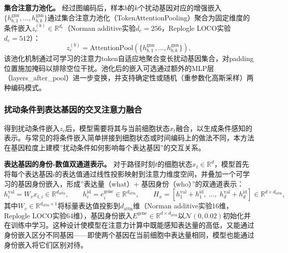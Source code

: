\textbf{集合注意力池化。} 经过图编码后，样本$b$的$k$个扰动基因对应的增强嵌入$\{h_{b,1}^{\mathrm{gnn}},\ldots,h_{b,k}^{\mathrm{gnn}}\}$通过集合注意力池化（TokenAttentionPooling）聚合为固定维度的条件嵌入$z_c^{(b)}\in\mathbb{R}^{d_c}$（Norman additive实验$d_c=256$，Replogle LOCO实验$d_c=512$）：
\begin{equation}
z_c^{(b)}=\mathrm{AttentionPool}\left(\{h_{b,1}^{\mathrm{gnn}},\ldots,h_{b,k}^{\mathrm{gnn}}\}\right),
\label{eq:set_pool}
\end{equation}
该池化机制通过可学习的注意力token自适应地聚合变长扰动基因集合，对padding位置施加掩码以排除空位干扰。池化后的嵌入可选通过额外的MLP层（layers\_after\_pool）进一步变换，并支持确定性或随机（重参数化高斯采样）两种编码模式。

\subsubsection{扰动条件到表达基因的交叉注意力融合}

得到扰动条件嵌入$z_c$后，模型需要将其与当前细胞状态$x_t$融合，以生成条件感知的表示。与常见的将条件嵌入简单拼接到细胞状态或时间编码上的做法不同，本方法在基因粒度上建模”扰动条件如何影响每个表达基因”的交互关系。

\textbf{表达基因的身份-数值双通道表示。} 对于路径时刻$t$的细胞状态$x_t\in\mathbb{R}^{d}$，模型首先将每个表达基因$i$的表达值通过线性投影映射到注意力维度空间，并叠加一个可学习的基因身份嵌入，形成”表达量（what）+ 基因身份（who）”的双通道表示：
\begin{equation}
h_i^{\mathrm{val}}=W_vx_{t,i}\in\mathbb{R}^{d_{\mathrm{attn}}},\qquad
h_i^{\mathrm{id}}=e_i^{\mathrm{gene}}\in\mathbb{R}^{d_{\mathrm{attn}}},\qquad
H_x=[h_1^{\mathrm{val}}+h_1^{\mathrm{id}},\;\ldots,\;h_d^{\mathrm{val}}+h_d^{\mathrm{id}}]\in\mathbb{R}^{d\times d_{\mathrm{attn}}},
\label{eq:gene_repr}
\end{equation}
其中$W_v\in\mathbb{R}^{d_{\mathrm{attn}}\times 1}$将标量表达值投影到$d_{\mathrm{attn}}$维（Norman additive实验16维，Replogle LOCO实验64维），基因身份嵌入$E^{\mathrm{gene}}\in\mathbb{R}^{d\times d_{\mathrm{attn}}}$以$\mathcal{N}(0,0.02)$初始化并在训练中学习。这种设计使模型在注意力计算中既能感知表达量的高低，又能通过身份嵌入区分不同基因——即使两个基因在当前细胞中表达量相同，模型也能通过身份嵌入将它们区别对待。

